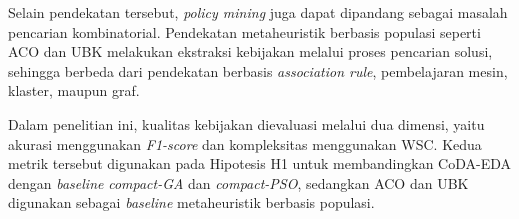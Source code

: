 Selain pendekatan tersebut, \textit{policy mining} juga dapat dipandang sebagai masalah pencarian kombinatorial.
Pendekatan metaheuristik berbasis populasi seperti ACO \parencite{siyuan_abac_2025} dan UBK \parencite{li_attribute_2026} melakukan ekstraksi kebijakan melalui proses pencarian solusi, sehingga berbeda dari pendekatan berbasis \textit{association rule}, pembelajaran mesin, klaster, maupun graf.

Dalam penelitian ini, kualitas kebijakan dievaluasi melalui dua dimensi, yaitu akurasi menggunakan \textit{F1-score} dan kompleksitas menggunakan WSC.
Kedua metrik tersebut digunakan pada Hipotesis H1 untuk membandingkan CoDA-EDA dengan \textit{baseline} \textit{compact-GA} dan \textit{compact-PSO}, sedangkan ACO dan UBK digunakan sebagai \textit{baseline} metaheuristik berbasis populasi.